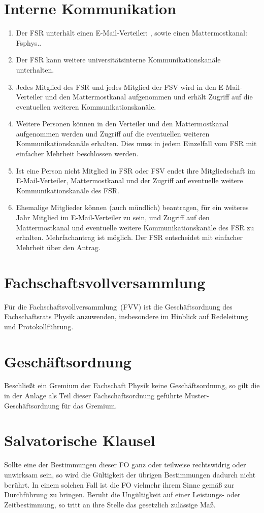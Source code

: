 \section{Interne Kommunikation}
\begin{enumerate}
	\item Der FSR unterhält einen E-Mail-Verteiler: , sowie einen Mattermostkanal: Fsphys..
	\item Der FSR kann weitere universitätsinterne Kommunikationskanäle unterhalten.
	\item Jedes Mitglied des FSR und jedes Mitglied der FSV wird in den E-Mail-Verteiler und den Mattermostkanal aufgenommen und erhält Zugriff auf die eventuellen weiteren Kommunikationskanäle.
	\item Weitere Personen können in den Verteiler und den Mattermostkanal aufgenommen werden und Zugriff auf die eventuellen weiteren Kommunikationskanäle erhalten. Dies muss in jedem Einzelfall vom FSR mit einfacher Mehrheit beschlossen werden.
	\item Ist eine Person nicht Mitglied in FSR oder FSV endet ihre Mitgliedschaft im E-Mail-Verteiler, Mattermostkanal und der Zugriff auf eventuelle weitere Kommunikationskanäle des FSR.
	\item Ehemalige Mitglieder können (auch mündlich) beantragen, für ein weiteres Jahr Mitglied im E-Mail-Verteiler zu sein, und Zugriff auf den Mattermostkanal und eventuelle weitere Kommunikationskanäle des FSR zu erhalten. Mehrfachantrag ist möglich. Der FSR entscheidet mit einfacher Mehrheit über den Antrag.
\end{enumerate}

\section{Fachschaftsvollversammlung}
Für die Fachschaftsvollversammlung~(FVV) ist die Geschäftsordnung des Fachschaftsrats Physik anzuwenden, insbesondere im Hinblick auf Redeleitung und Protokollführung.

\section{Geschäftsordnung}
Beschließt ein Gremium der Fachschaft Physik keine Geschäftsordnung, so gilt die in der Anlage als Teil dieser Fachschaftsordnung geführte Muster-Geschäftsordnung für das Gremium.

\section{Salvatorische Klausel}
Sollte eine der Bestimmungen dieser FO ganz oder teilweise rechtswidrig oder unwirksam sein, so wird die Gültigkeit der übrigen Bestimmungen dadurch nicht berührt. In einem solchen Fall ist die FO vielmehr ihrem Sinne gemäß zur Durchführung zu bringen. Beruht die Ungültigkeit auf einer Leistungs- oder Zeitbestimmung, so tritt an ihre Stelle das gesetzlich zulässige Maß.


